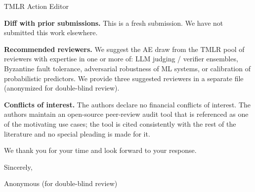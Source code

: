 \documentclass[11pt]{letter}
\begin{document}
\begin{letter}{TMLR Action Editor}
\bigskip

\noindent\textbf{Diff with prior submissions.} This is a fresh
submission. We have not submitted this work elsewhere.

\bigskip

\noindent\textbf{Recommended reviewers.} We suggest the AE draw from
the TMLR pool of reviewers with expertise in one or more of: LLM
judging / verifier ensembles, Byzantine fault tolerance, adversarial
robustness of ML systems, or calibration of probabilistic predictors.
We provide three suggested reviewers in a separate file (anonymized
for double-blind review).

\bigskip

\noindent\textbf{Conflicts of interest.} The authors declare no
financial conflicts of interest. The authors maintain an open-source
peer-review audit tool that is referenced as one of the motivating use
cases; the tool is cited consistently with the rest of the literature
and no special pleading is made for it.

\bigskip

We thank you for your time and look forward to your response.

\bigskip

Sincerely,

\bigskip

Anonymous (for double-blind review)

\end{letter}
\end{document}
